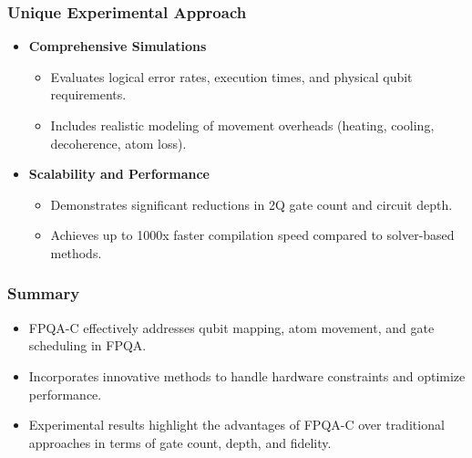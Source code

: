 \documentclass[18 pt]{beamer}
\begin{document}

\begin{frame}
    \frametitle{Unique Experimental Approach}
    \begin{itemize}
        \item \textbf{Comprehensive Simulations}
        \begin{itemize}
            \item Evaluates logical error rates, execution times, and physical qubit requirements.
            \item Includes realistic modeling of movement overheads (heating, cooling, decoherence, atom loss).
        \end{itemize}
        \item \textbf{Scalability and Performance}
        \begin{itemize}
            \item Demonstrates significant reductions in 2Q gate count and circuit depth.
            \item Achieves up to 1000x faster compilation speed compared to solver-based methods.
        \end{itemize}
    \end{itemize}
\end{frame}

\begin{frame}
    \frametitle{Summary}
    \begin{itemize}
        \item FPQA-C effectively addresses qubit mapping, atom movement, and gate scheduling in FPQA.
        \item Incorporates innovative methods to handle hardware constraints and optimize performance.
        \item Experimental results highlight the advantages of FPQA-C over traditional approaches in terms of gate count, depth, and fidelity.
    \end{itemize}
\end{frame}
\end{document}
